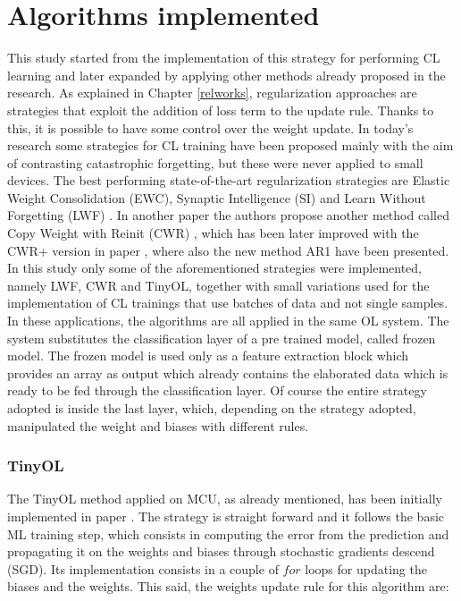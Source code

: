\documentclass[12pt]{report}
\begin{document}
\section{Algorithms implemented}
This study started from the implementation of this strategy for performing CL learning and later expanded by applying other methods already proposed in the research. As explained in Chapter \ref{relworks}, regularization approaches are strategies that exploit the addition of loss term to the update rule. Thanks to this, it is possible to have some control over the weight update. In today's research some strategies for CL training have been proposed mainly with the aim of contrasting catastrophic forgetting, but these were never applied to small devices. The best performing state-of-the-art regularization strategies are Elastic Weight Consolidation (EWC), Synaptic Intelligence (SI) and Learn Without Forgetting (LWF) \autocite{li2017learning}. In another paper the authors propose another method called Copy Weight with Reinit (CWR) \autocite{lomonaco2017core50}, which has been later improved with the CWR+ version in paper \autocite{maltoni2019continuous}, where also the new method AR1 have been presented. In this study only some of the aforementioned strategies were implemented, namely LWF, CWR and TinyOL, together with small variations used for the implementation of CL trainings that use batches of data and not single samples. \\
In these applications, the algorithms are all applied in the same OL system. The system substitutes the classification layer of a pre trained model, called frozen model. The frozen model is used only as a feature extraction block which provides an array as output which already contains the elaborated data which is ready to be fed through the classification layer. Of course the entire strategy adopted is inside the last layer, which, depending on the strategy adopted, manipulated the weight and biases with different rules.

\subsubsection{TinyOL}
The TinyOL method applied on MCU, as already mentioned, has been initially implemented in paper \autocite{ren2021tinyol}. The strategy is straight forward and it follows the basic ML training step, which consists in computing the error from the prediction and propagating it on the weights and biases through stochastic gradients descend (SGD). Its implementation consists in a couple of $for$ loops for updating the biases and the weights. This said, the weights update rule for this algorithm are:
\end{document}
